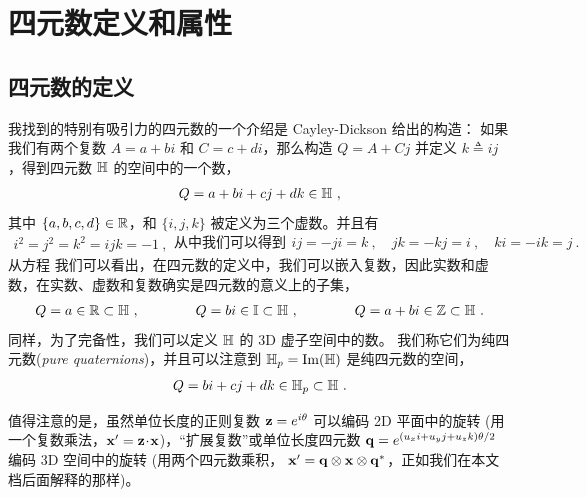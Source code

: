 

\section{四元数定义和属性}

\subsection{四元数的定义}

我找到的特别有吸引力的四元数的一个介绍是 Cayley-Dickson 给出的构造：
如果我们有两个复数 $A=a+bi$ 和 $C=c+di$，那么构造 $Q=A+Cj$ 并定义 $k\triangleq ij$ ，得到四元数 ${\mathbb H}$ 的空间中的一个数，
%
\begin{align}
Q = a + bi + cj + dk \in{\mathbb H} ~, \label{equ:ijkQuat}
\end{align}%
%
其中 $\{a,b,c,d\}\in{\mathbb R}$，和 $\{i,j,k\}$ 被定义为三个虚数。并且有
%
\begin{subequations}
\label{equ:quatAlgebra}
\begin{align}
i^2=j^2=k^2=ijk=-1~,
\end{align}%
%
从中我们可以得到
%
\begin{align}
ij = -ji = k ~, \quad jk=-kj=i~, \quad ki=-ik=j~.
\end{align}
\end{subequations}
%
从方程  我们可以看出，在四元数的定义中，我们可以嵌入复数，因此实数和虚数，在实数、虚数和复数确实是四元数的意义上的子集，
%
\begin{align}
Q = a \in {\mathbb R} \subset {\mathbb H}~,
\qquad\qquad 
Q=bi \in {\mathbb I} \subset {\mathbb H}~,
\qquad\qquad 
Q=a+bi \in {\mathbb Z} \subset {\mathbb H}~.
\end{align}
%
同样，为了完备性，我们可以定义 ${\mathbb H}$ 的 3D 虚子空间中的数。
我们称它们为纯四元数(\emph{pure quaternions})，并且可以注意到 ${\mathbb H}_p=\operatorname{Im}({\mathbb H})$ 是纯四元数的空间，
%
\begin{align}
Q=bi+cj+dk \in{\mathbb H}_p \subset{\mathbb H}~.
\end{align}


值得注意的是，虽然单位长度的正则复数 ${\bf z}=e^{i\theta}$ 可以编码 2D 平面中的旋转 (用一个复数乘法，${\bf x}'={\bf z}\!\cdot\!{\bf x}$)，“扩展复数”或单位长度四元数 ${\bf q}=e^{(u_xi+u_yj+u_zk)\theta/2}$ 编码 3D 空间中的旋转 (用两个四元数乘积， ${\bf x}'={\bf q}\otimes{\bf x}\otimes{\bf q}^*$，正如我们在本文档后面解释的那样)。



